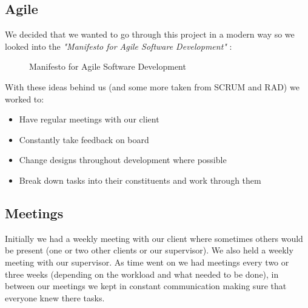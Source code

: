 \subsection{Agile}
We decided that we wanted to go through this project in a modern way so we looked into the \textit{"Manifesto for Agile Software Development"} \cite{manifesto_for_agile}:
\begin{figure}[H] 
	\caption{Manifesto for Agile Software Development}
	\label{fig:speciation}
\end{figure}
With these ideas behind us (and some more taken from SCRUM and RAD) we worked to:
\begin{itemize}
	\item Have regular meetings with our client
	\item Constantly take feedback on board
	\item Change designs throughout development where possible
	\item Break down tasks into their constituents and work through them
\end{itemize}

\subsection{Meetings}
Initially we had a weekly meeting with our client where sometimes others would be present (one or two other clients or our supervisor). 
We also held a weekly meeting with our supervisor.
As time went on we had meetings every two or three weeks (depending on the workload and what needed to be done), in between our meetings we kept in constant communication making sure that everyone knew there tasks.

